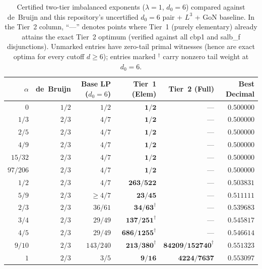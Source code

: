\documentclass[11pt,a4paper]{amsart}
\theoremstyle{plain}
\theoremstyle{definition}
\theoremstyle{remark}
\begin{document}
\begin{table}[ht]
\centering
\caption{Certified two-tier imbalanced exponents ($\lambda = 1$, $d_0 = 6$) compared against de~Bruijn and this repository's uncertified $d_0=6$ pair + $L^3$ + \textsf{GoN} baseline. In the Tier~2 column, ``---'' denotes points where Tier~1 (purely elementary) already attains the exact Tier~2 optimum (verified against all \textsf{cbp1} and \textsf{salb\_f} disjunctions). Unmarked entries have zero-tail primal witnesses (hence are exact optima for every cutoff $d \ge 6$); entries marked $^\dagger$ carry nonzero tail weight at $d_0 = 6$.}
\label{tab:imbalanced}
\footnotesize
\setlength{\tabcolsep}{4pt}
\begin{tabular}{@{}rrrrrr@{}}
\toprule
$\alpha$ & de~Bruijn & Base LP ($d_0=6$) & \textbf{Tier~1 (Elem)} & \textbf{Tier~2 (Full)} & Best Decimal \\
\midrule
$0$      & $1/2$ & $1/2$     & $\mathbf{1/2}$           & ---                          & $0.500000$ \\
$1/3$    & $2/3$ & $4/7$     & $\mathbf{1/2}$           & ---                          & $0.500000$ \\
$2/5$    & $2/3$ & $4/7$     & $\mathbf{1/2}$           & ---                          & $0.500000$ \\
$4/9$    & $2/3$ & $4/7$     & $\mathbf{1/2}$           & ---                          & $0.500000$ \\
$15/32$  & $2/3$ & $4/7$     & $\mathbf{1/2}$           & ---                          & $0.500000$ \\
$97/206$ & $2/3$ & $4/7$     & $\mathbf{1/2}$           & ---                          & $0.500000$ \\
$1/2$    & $2/3$ & $4/7$     & $\mathbf{263/522}$       & ---                          & $0.503831$ \\
$5/9$    & $2/3$ & $\ge 4/7$ & $\mathbf{23/45}$         & ---                          & $0.511111$ \\
$2/3$    & $2/3$ & $36/61$   & $\mathbf{34/63}^\dagger$ & ---                          & $0.539683$ \\
$3/4$    & $2/3$ & $29/49$   & $\mathbf{137/251}^\dagger$ & ---                        & $0.545817$ \\
$4/5$    & $2/3$ & $29/49$   & $\mathbf{686/1255}^\dagger$ & ---                       & $0.546614$ \\
$9/10$   & $2/3$ & $143/240$ & $\mathbf{213/380}^\dagger$ & $\mathbf{84209/152740}^\dagger$ & $0.551323$ \\
$1$      & $2/3$ & $3/5$     & $\mathbf{9/16}$          & $\mathbf{4224/7637}$         & $0.553097$ \\
\bottomrule
\end{tabular}
\end{table}
\end{document}
